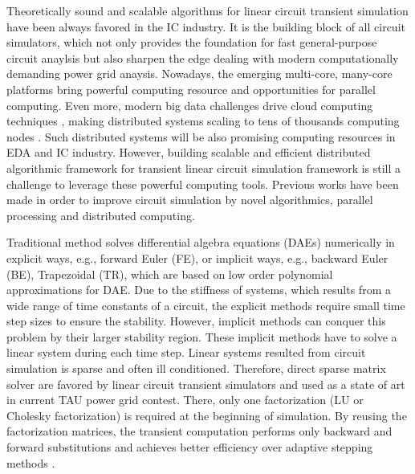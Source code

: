 

\begin{comment}
Circuit simulation is an important and 
{\color{red} heavily used process}
during the cycle of integrated circuit (IC) designs.
The increasing integration between functional modules and interconnects
parasitic effects of modern VLSI design aggravates such simulation tasks,
rendering the transient simulation of the full system very inefficient.
Therefore, accurate yet fast circuit simulation methods have always been 
desired in the IC industry. 
\end{comment}
Theoretically sound and scalable algorithms
for linear circuit transient simulation have been always favored in the IC industry. 
It is the building block of all circuit simulators, 
which not only provides the foundation for fast general-purpose circuit anaylsis 
but also sharpen the edge dealing with modern computationally demanding power grid anaysis.
Nowadays, the emerging multi-core, many-core platforms bring powerful 
computing resource and opportunities for parallel computing. 
Even more, modern big data challenges drive cloud computing techniques \cite{cloud}, 
making distributed systems scaling to tens of thousands computing nodes
\cite{mesos, mapreduce, spark10, dryad}.
Such distributed systems will be also promising computing resources in EDA and IC industry.
However, building scalable and efficient distributed algorithmic framework for 
transient linear circuit simulation framework is still a challenge to leverage these powerful computing tools.
Previous works 
\cite{Dong08, Dong09, Li11, Weng12_ICCAD, Weng12_TCAD, Ye08, Wang13}
have been made in order to improve circuit simulation by novel algorithmics, 
parallel processing and distributed computing.

Traditional method solves differential algebra equations (DAEs) 
numerically in explicit ways, e.g., forward Euler (FE), or implicit ways, 
e.g., backward Euler (BE), Trapezoidal (TR), which are based on low order polynomial approximations for DAE.
Due to the stiffness of systems, which results from a wide range of time constants of a circuit,
the explicit methods require small time step sizes to ensure the stability.
However, implicit methods can conquer this problem by their larger stability
region. These implicit methods have to solve a linear system during each time step.
Linear systems resulted from circuit simulation is sparse and often ill conditioned.
Therefore, direct sparse matrix solver\cite{Davis06} are favored by 
linear circuit transient simulators and used as a state of art in 
current TAU power grid contest. 
There, only one factorization (LU or Cholesky factorization) is required
at the beginning of simulation.  
By reusing the factorization matrices, 
the transient computation performs only backward and forward substitutions 
and achieves better efficiency over adaptive stepping methods \cite{Xiong12, Yu12, Li12_Tau}.

